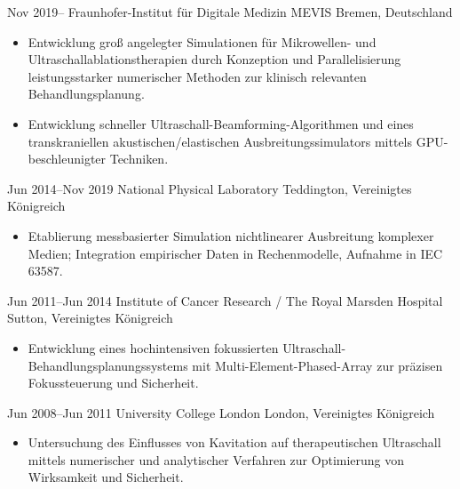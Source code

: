 \documentclass[german, print]{cv-style-wide}
\begin{document}
\begin{entrylist}

\entry
  {Nov 2019--}
  {Fraunhofer-Institut für Digitale Medizin MEVIS}
  {Bremen, Deutschland}
  {%
   \begin{itemize}[topsep=0pt]
     \item Entwicklung groß angelegter Simulationen für Mikrowellen- und Ultraschallablationstherapien durch Konzeption und Parallelisierung leistungsstarker numerischer Methoden zur klinisch relevanten Behandlungsplanung.
     \item Entwicklung schneller Ultraschall-Beamforming-Algorithmen und eines transkraniellen akustischen/elastischen Ausbreitungssimulators mittels GPU-beschleunigter Techniken.
   \end{itemize}}

\entry
  {Jun 2014--Nov 2019}
  {National Physical Laboratory}
  {Teddington, Vereinigtes Königreich}
  {%
   \begin{itemize}
     \item Etablierung messbasierter Simulation nichtlinearer Ausbreitung komplexer Medien; Integration empirischer Daten in Rechenmodelle, Aufnahme in IEC 63587.
   \end{itemize}}

\entry
  {Jun 2011--Jun 2014}
  {Institute of Cancer Research / The Royal Marsden Hospital}
  {Sutton, Vereinigtes Königreich}
  {%
   \begin{itemize}
     \item Entwicklung eines hochintensiven fokussierten Ultraschall-Behandlungsplanungssystems mit Multi-Element-Phased-Array zur präzisen Fokussteuerung und Sicherheit.
   \end{itemize}}

\entry
  {Jun 2008--Jun 2011}
  {University College London}
  {London, Vereinigtes Königreich}
  {%
   \begin{itemize}
     \item Untersuchung des Einflusses von Kavitation auf therapeutischen Ultraschall mittels numerischer und analytischer Verfahren zur Optimierung von Wirksamkeit und Sicherheit.
   \end{itemize}}

\end{entrylist}
\end{document}
